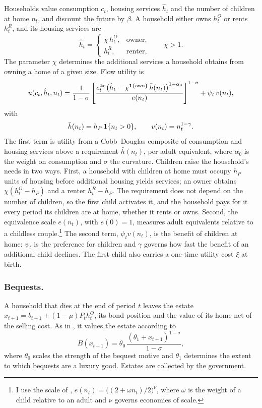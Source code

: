 Households value consumption $c_t$, housing services $\hat h_t$ and the
number of children at home $n_t$, and discount the future by $\beta$. A
household either owns $h^O_t$ or rents $h^R_t$, and its housing services are
\begin{equation*}
 \hat h_t=\begin{cases}\chi\,h^O_t, & \text{owner},\\ h^R_t, & \text{renter},\end{cases}
 \qquad \chi>1 .
\end{equation*}
The parameter $\chi$ determines the additional services a household obtains
from owning a home of a given size. Flow utility is
\begin{equation}
 u(c_t,\hat h_t,n_t)=\frac{1}{1-\sigma}\left[\frac{c_t^{\alpha_0}\bigl(\hat h_t-\chi^{\mathbf 1\{\text{own}\}}\,\bar h(n_t)\bigr)^{1-\alpha_0}}{e(n_t)}\right]^{1-\sigma}+\psi_t\,v(n_t),
 \label{eq:m-utility}
\end{equation}
with
\begin{equation*}
 \bar h(n_t)=h_P\,\mathbf 1\{n_t>0\},\qquad v(n_t)=n_t^{1-\gamma}.
\end{equation*}
The first term is utility from a Cobb--Douglas composite of consumption and
housing services above a requirement $\bar h(n_t)$, per adult equivalent,
where $\alpha_0$ is the weight on consumption and $\sigma$ the curvature.
Children raise the household's needs in two ways. First, a household with
children at home must occupy $h_P$ units of housing before additional housing
yields services; an owner obtains $\chi(h^O_t-h_P)$ and a renter $h^R_t-h_P$.
The requirement does not depend on the number of children, so the first
child activates it, and the household pays for it every period its children
are at home, whether it rents or owns. Second, the equivalence scale
$e(n_t)$, with $e(0)=1$, measures adult equivalents relative to a childless
couple.\footnote{I use the scale of
\citet{scholzSeshadriKhitatrakunSaving2006},
$e(n_t)=\bigl((2+\omega n_t)/2\bigr)^{\nu}$, where $\omega$ is the weight of
a child relative to an adult and $\nu$ governs economies of scale.} The second
term, $\psi_t v(n_t)$, is the benefit of children at home: $\psi_t$ is the
preference for children and $\gamma$ governs how fast the benefit of an
additional child declines. The first child also carries a one-time utility
cost $\xi$ at birth.

\subsubsection*{Bequests.}
A household that dies at the end of period $t$ leaves the estate
$x_{t+1}=b_{t+1}+(1-\mu)P_th^O_t$, its bond position and the value of its
home net of the selling cost. As in \citet{deNardiWealthInequality2004}, it
values the estate according to
\begin{equation*}
 B(x_{t+1})=\theta_0\,\frac{(\theta_1+x_{t+1})^{1-\sigma}}{1-\sigma},
\end{equation*}
where $\theta_0$ scales the strength of the bequest motive and $\theta_1$
determines the extent to which bequests are a luxury good. Estates are
collected by the government.

